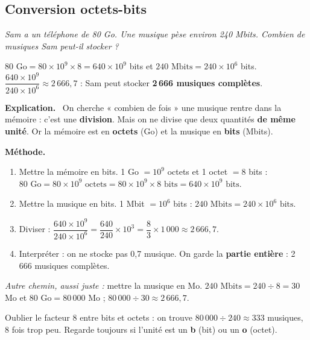 \documentclass[addpoints, 11pt]{exam}
\newcommand{\enonce}[1]{\textit{#1}\par\smallskip}
\newcommand{\methode}{\par\smallskip\noindent\textbf{Méthode.}\ }
\newcommand{\explication}{\par\smallskip\noindent\textbf{Explication.}\ }
\DeclareRobustCommand{\_}{\textunderscore\allowbreak}
\begin{document}
\begin{questions}

\section{Conversion octets-bits}

\question[1] \enonce{Sam a un téléphone de 80 Go. Une musique pèse environ 240 Mbits. Combien de musiques Sam peut-il stocker ?}

\begin{reponse}
$80 \text{ Go} = 80 \times 10^9 \times 8 = 640 \times 10^9$ bits et $240 \text{ Mbits} = 240 \times 10^6$ bits.\\
$\dfrac{640 \times 10^9}{240 \times 10^6} \approx 2\,666{,}7$ : Sam peut stocker \textbf{2\,666 musiques complètes}.
\end{reponse}

\explication
On cherche « combien de fois » une musique rentre dans la mémoire : c'est une \textbf{division}. Mais on ne divise que deux quantités \textbf{de même unité}. Or la mémoire est en \textbf{octets} (Go) et la musique en \textbf{bits} (Mbits).

\methode
\begin{enumerate}
  \item Mettre la mémoire en bits. 1 Go $= 10^9$ octets et 1 octet $=8$ bits :\\
  $80 \text{ Go} = 80 \times 10^9 \text{ octets} = 80 \times 10^9 \times 8 \text{ bits} = 640 \times 10^9 \text{ bits}$.
  \item Mettre la musique en bits. 1 Mbit $= 10^6$ bits : $240 \text{ Mbits} = 240 \times 10^6 \text{ bits}$.
  \item Diviser :
  $\dfrac{640 \times 10^9}{240 \times 10^6} = \dfrac{640}{240} \times 10^{3} = \dfrac{8}{3} \times 1\,000 \approx 2\,666{,}7$.
  \item Interpréter : on ne stocke pas 0,7 musique. On garde la \textbf{partie entière} : 2\,666 musiques complètes.
\end{enumerate}
\textit{Autre chemin, aussi juste :} mettre la musique en Mo. $240 \text{ Mbits} = 240 \div 8 = 30$ Mo et $80 \text{ Go} = 80\,000$ Mo ; $80\,000 \div 30 \approx 2\,666{,}7$.

\begin{erreur}
Oublier le facteur 8 entre bits et octets : on trouve $80\,000 \div 240 \approx 333$ musiques, 8 fois trop peu. Regarde toujours si l'unité est un \textbf{b} (bit) ou un \textbf{o} (octet).
\end{erreur}


\end{questions}
\end{document}
